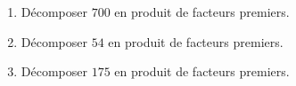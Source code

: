 \begin{minipage}{0.99\linewidth}

\exo

\begin{enumerate}

\item Décomposer $700$ en produit de facteurs premiers.
\item Décomposer $54$ en produit de facteurs premiers.
\item Décomposer $175$ en produit de facteurs premiers.

\end{enumerate}
\end{minipage}

\vspace{0.5cm}
